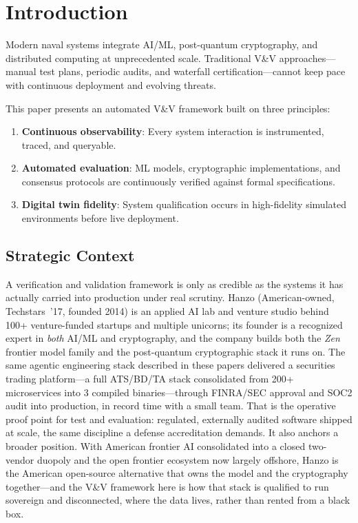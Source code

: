 \documentclass[11pt,letterpaper]{article}
\begin{document}
\section{Introduction}

Modern naval systems integrate AI/ML, post-quantum cryptography, and distributed computing at unprecedented scale. Traditional V\&V approaches---manual test plans, periodic audits, and waterfall certification---cannot keep pace with continuous deployment and evolving threats.

This paper presents an automated V\&V framework built on three principles:
\begin{enumerate}
\item \textbf{Continuous observability}: Every system interaction is instrumented, traced, and queryable.
\item \textbf{Automated evaluation}: ML models, cryptographic implementations, and consensus protocols are continuously verified against formal specifications.
\item \textbf{Digital twin fidelity}: System qualification occurs in high-fidelity simulated environments before live deployment.
\end{enumerate}

\subsection{Strategic Context}

A verification and validation framework is only as credible as the systems it has actually carried into production under real scrutiny. Hanzo (American-owned, Techstars~'17, founded 2014) is an applied AI lab and venture studio behind 100+ venture-funded startups and multiple unicorns; its founder is a recognized expert in \emph{both} AI/ML and cryptography, and the company builds both the \emph{Zen} frontier model family and the post-quantum cryptographic stack it runs on. The same agentic engineering stack described in these papers delivered a securities trading platform---a full ATS/BD/TA stack consolidated from 200+ microservices into 3 compiled binaries---through FINRA/SEC approval and SOC2 audit into production, in record time with a small team. That is the operative proof point for test and evaluation: regulated, externally audited software shipped at scale, the same discipline a defense accreditation demands. It also anchors a broader position. With American frontier AI consolidated into a closed two-vendor duopoly and the open frontier ecosystem now largely offshore, Hanzo is the American open-source alternative that owns the model and the cryptography together---and the V\&V framework here is how that stack is qualified to run sovereign and disconnected, where the data lives, rather than rented from a black box.
\end{document}
